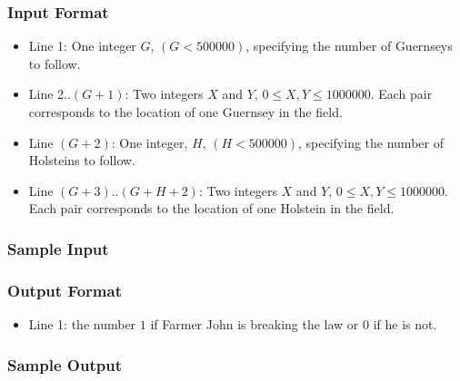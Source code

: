 \subsubsection{Input Format}
\begin{itemize}
	\item Line 1: One integer $G$, $(G < 500000)$, specifying the number of Guernseys to follow.
	\item Line 2..$(G+1)$: Two integers $X$ and $Y$, $0 \leq X,Y \leq 1000000$.
		Each pair corresponds to the location of one Guernsey in the field.
	\item Line $(G+2)$: One integer, $H$, $(H < 500000)$, specifying the number of Holsteins to follow. 
	\item Line $(G+3)$..$(G+H+2)$: Two integers $X$ and $Y$, $0 \leq X,Y \leq 1000000$.
		Each pair corresponds to the location of one Holstein in the field.
\end{itemize}

\subsubsection{Sample Input}

\subsubsection{Output Format}
\begin{itemize}
	\item Line 1: the number $1$ if Farmer John is breaking the law or $0$ if he is not.
\end{itemize}

\subsubsection{Sample Output}
